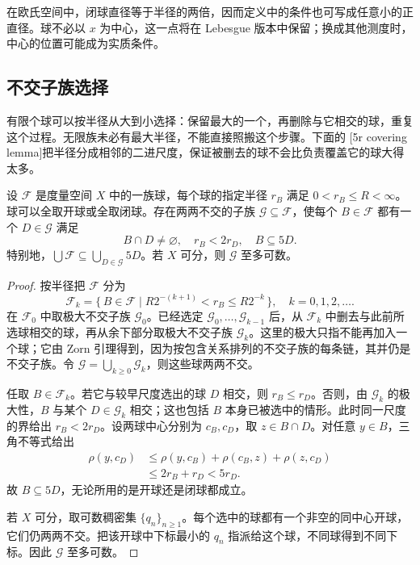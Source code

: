 \ProseParagraphBreak

在欧氏空间中，闭球直径等于半径的两倍，因而定义中的条件也可写成任意小的正直径。球不必以 \(x\) 为中心，这一点将在 Lebesgue 版本中保留；换成其他测度时，中心的位置可能成为实质条件。

\subsection{不交子族选择}
\label{b1:subsec:130102}

有限个球可以按半径从大到小选择：保留最大的一个，再删除与它相交的球，重复这个过程。无限族未必有最大半径，不能直接照搬这个步骤。下面的 [5r covering lemma]把半径分成相邻的二进尺度，保证被删去的球不会比负责覆盖它的球大得太多。

\begin{lemma}
\label{b1:lem:five-r-covering}
设 \(\mathcal F\) 是度量空间 \(X\) 中的一族球，每个球的指定半径 \(r_B\) 满足 \(0<r_B\leq R<\infty\)。球可以全取开球或全取闭球。存在两两不交的子族 \(\mathcal G\subseteq\mathcal F\)，使每个 \(B\in\mathcal F\) 都有一个 \(D\in\mathcal G\) 满足
\[
B\cap D\ne\varnothing,
\quad
r_B<2r_D,
\quad
B\subseteq5D.
\]
特别地，\(\bigcup\mathcal F\subseteq\bigcup_{D\in\mathcal G}5D\)。若 \(X\) 可分，则 \(\mathcal G\) 至多可数。
\end{lemma}
\begin{proof}
按半径把 \(\mathcal F\) 分为
\[
\mathcal F_k
=\{\,B\in\mathcal F\mid R2^{-(k+1)}<r_B\leq R2^{-k}\,\},
\quad k=0,1,2,\ldots.
\]
在 \(\mathcal F_0\) 中取极大不交子族 \(\mathcal G_0\)。已经选定 \(\mathcal G_0,\ldots,\mathcal G_{k-1}\) 后，从 \(\mathcal F_k\) 中删去与此前所选球相交的球，再从余下部分取极大不交子族 \(\mathcal G_k\)。这里的极大只指不能再加入一个球；它由 Zorn 引理得到，因为按包含关系排列的不交子族的每条链，其并仍是不交子族。令 \(\mathcal G=\bigcup_{k\geq0}\mathcal G_k\)，则这些球两两不交。

任取 \(B\in\mathcal F_k\)。若它与较早尺度选出的球 \(D\) 相交，则 \(r_B\leq r_D\)。否则，由 \(\mathcal G_k\) 的极大性，\(B\) 与某个 \(D\in\mathcal G_k\) 相交；这也包括 \(B\) 本身已被选中的情形。此时同一尺度的界给出 \(r_B<2r_D\)。设两球中心分别为 \(c_B,c_D\)，取 \(z\in B\cap D\)。对任意 \(y\in B\)，三角不等式给出
\[
\begin{aligned}
\rho(y,c_D)
&\leq\rho(y,c_B)+\rho(c_B,z)+\rho(z,c_D)\\
&\leq2r_B+r_D<5r_D.
\end{aligned}
\]
故 \(B\subseteq5D\)，无论所用的是开球还是闭球都成立。

若 \(X\) 可分，取可数稠密集 \(\{q_n\}_{n\geq1}\)。每个选中的球都有一个非空的同中心开球，它们仍两两不交。把该开球中下标最小的 \(q_n\) 指派给这个球，不同球得到不同下标。因此 \(\mathcal G\) 至多可数。
\end{proof}

